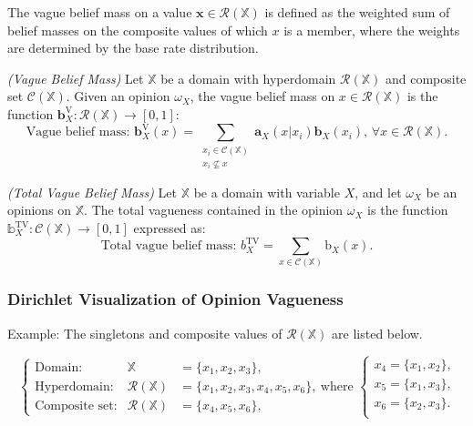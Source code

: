 The vague belief mass on a value $\mathbf{x} \in \mathcal{R}(\mathbb{X})$ is defined as the weighted sum of belief masses on the composite values of which $x$ is a member, where the weights are determined by the base rate distribution.

\begin{definition}
    \emph{(Vague Belief Mass)} Let $\mathbb{X}$ be a domain with hyperdomain $\mathcal{R}(\mathbb{X})$ and composite set $\mathcal{C}(\mathbb{X})$. Given an
opinion $\omega_X$, the vague belief mass on $x \in \mathcal{R}(\mathbb{X})$ is the function $\mathbf{b}^\mathrm{V}_X : \mathcal{R}(\mathbb{X}) \rightarrow [0, 1]$:
    \begin{equation}
        \text{Vague belief mass: } \mathbf{b}^{\mathrm{V}}_X(x) = \sum\limits_{\substack{x_i \in \mathcal{C}(\mathbb{X}) \\ x_i \nsubseteq x}} \mathbf{a}_X(x | x_i) \mathbf{b}_X(x_i) \text{, } \forall x \in \mathcal{R}(\mathbb{X}) \text{.}
    \end{equation}
\end{definition}

\begin{definition}
    \emph{(Total Vague Belief Mass)} Let $\mathbb{X}$ be a domain with variable $X$, and
let $\omega_X$ be an opinions on $\mathbb{X}$. The total vagueness contained in the opinion $\omega_X$ is the
function $\mathbb{b}^{\mathrm{TV}}_X : \mathcal{C}(\mathbb{X}) \rightarrow [0, 1]$ expressed as:
    \begin{equation}
        \text{Total vague belief mass: } b^{\mathrm{TV}}_X = \sum\limits_{x \in \mathcal{C}(\mathbb{X})} \mathrm{b}_X(x) \text{.}
    \end{equation}
\end{definition}

\subsubsection{Dirichlet Visualization of Opinion Vagueness}

Example: The singletons and composite values of $\mathcal{R}(\mathbb{X})$ are listed below.

\begin{equation}
    \left\{\begin{array}{lll}
        \text{Domain:}        & \mathbb{X}              & = \{x_1, x_2, x_3\} \text{, } \\
        \text{Hyperdomain:}   & \mathcal{R}(\mathbb{X}) & = \{x_1, x_2, x_3, x_4, x_5, x_6\} \text{,} \\
        \text{Composite set:} & \mathcal{R}(\mathbb{X}) & = \{x_4, x_5, x_6\} \text{,}
    \end{array}\right. \text{where }
    \left\{\begin{array}{l}
        x_4 = \{x_1, x_2\} \text{,} \\
        x_5 = \{x_1, x_3\} \text{,} \\
        x_6 = \{x_2, x_3\} \text{.} \\
    \end{array}\right.
\end{equation}

